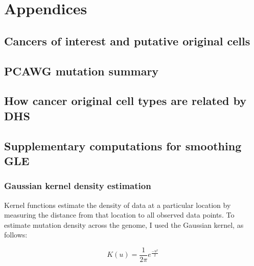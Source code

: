 \newpage
\setcounter{table}{0}
\setcounter{figure}{0}
\setcounter{section}{0}
\renewcommand\thesection{A.\arabic{section}} 
\renewcommand\thefigure{A\arabic{figure}} 
\renewcommand\thetable{A\arabic{table}} 

\chapter*{Appendices}

\section{Cancers of interest and putative original cells}


\section{PCAWG mutation summary}
\vspace{1cm}

\vspace{2cm}


\newpage
\section{How cancer original cell types are related by DHS}

\vspace{1cm}


\newpage
\section{Supplementary computations for smoothing GLE}
\subsection{Gaussian kernel density estimation}

Kernel functions estimate the density of data at a particular location by measuring the distance from that location to all observed data points. To estimate mutation density across the genome, I used the Gaussian kernel, as follows:

\begin{equation}
    K(u) = \frac{1}{2\pi} e^{\frac{-u^2}{2}}
    \label{eq:gaussian}
\end{equation}

